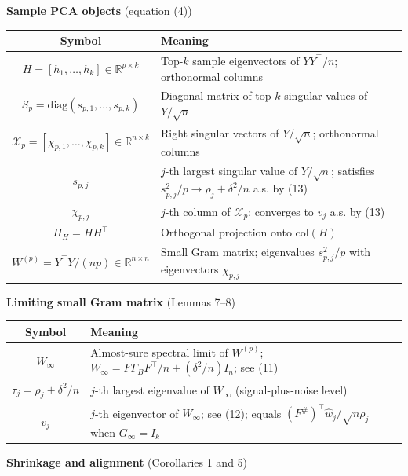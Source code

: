 \documentclass{article}
\theoremstyle{remark}
\begin{document}
\textbf{Sample PCA objects} (equation (4))

\begin{center}
\begin{tabular}{|c|l|}
\hline
Symbol & Meaning \\
\hline
$H = [h_1,\ldots,h_k]\in\mathbb{R}^{p\times k}$ & Top-$k$ sample eigenvectors of $YY^\top/n$; orthonormal columns \\
\hline
$S_p = \mathrm{diag}(s_{p,1},\ldots,s_{p,k})$ & Diagonal matrix of top-$k$ singular values of $Y/\sqrt{n}$ \\
\hline
$\mathcal{X}_p = [\chi_{p,1},\ldots,\chi_{p,k}]\in\mathbb{R}^{n\times k}$ & Right singular vectors of $Y/\sqrt{n}$; orthonormal columns \\
\hline
$s_{p,j}$ & $j$-th largest singular value of $Y/\sqrt{n}$; satisfies $s_{p,j}^2/p \to \rho_j + \delta^2/n$ a.s. by (13) \\
\hline
$\chi_{p,j}$ & $j$-th column of $\mathcal{X}_p$; converges to $v_j$ a.s. by (13) \\
\hline
$\Pi_H = HH^\top$ & Orthogonal projection onto $\mathrm{col}(H)$ \\
\hline
$W^{(p)} = Y^\top Y/(np) \in \mathbb{R}^{n\times n}$ & Small Gram matrix; eigenvalues $s_{p,j}^2/p$ with eigenvectors $\chi_{p,j}$ \\
\hline
\end{tabular}
\end{center}

\textbf{Limiting small Gram matrix} (Lemmas 7–8)

\begin{center}
\begin{tabular}{|c|l|}
\hline
Symbol & Meaning \\
\hline
$W_\infty$ & Almost-sure spectral limit of $W^{(p)}$; $W_\infty = F\Gamma_B F^\top/n + (\delta^2/n)I_n$; see (11) \\
\hline
$\tau_j = \rho_j + \delta^2/n$ & $j$-th largest eigenvalue of $W_\infty$ (signal-plus-noise level) \\
\hline
$v_j$ & $j$-th eigenvector of $W_\infty$; see (12); equals $(F^\#)^\top\hat{w}_j/\sqrt{n\rho_j}$ when $G_\infty = I_k$ \\
\hline
\end{tabular}
\end{center}

\textbf{Shrinkage and alignment} (Corollaries 1 and 5)
\end{document}
